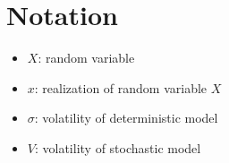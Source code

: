 \chapter*{Notation}
\label{c:Notation}

\begin{itemize}
	\item $X$: random variable
	\item $x$: realization of random variable $X$
	\item $\sigma$: volatility of deterministic model
	\item $V$: volatility of stochastic model
\end{itemize}
